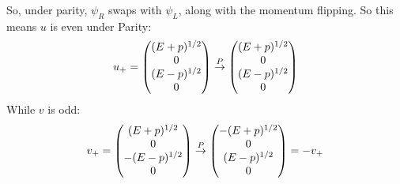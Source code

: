 So, under parity, $\psi_R$ swaps with $\psi_L$, along with the momentum flipping. So this means $u$ is even under Parity:
\begin{align*}
  u_+=\pmqty{(E+p)^{1/2}\\0\\(E-p)^{1/2}\\0}
  \overset{P}{\rightarrow}\pmqty{(E+p)^{1/2}\\0\\(E-p)^{1/2}\\0}
\end{align*}
While $v$ is odd:
\begin{align*}
  v_+=\pmqty{(E+p)^{1/2}\\0\\-(E-p)^{1/2}\\0}
  \overset{P}{\rightarrow}\pmqty{-(E+p)^{1/2}\\0\\(E-p)^{1/2}\\0}=-v_+
\end{align*}